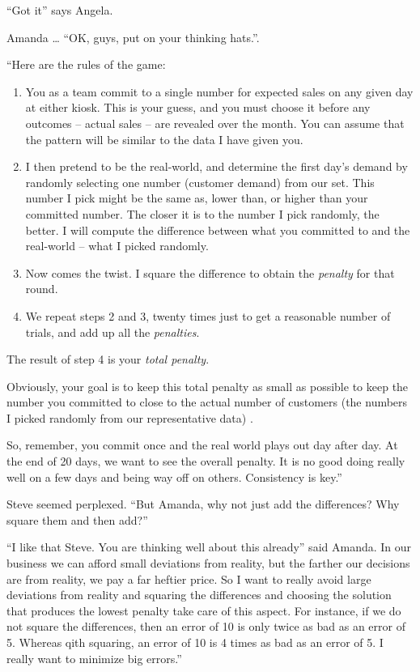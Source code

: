 \documentclass[
  12pt,
  letterpaper,
  DIV=11,
  numbers=noendperiod]{scrreprt}
\begin{document}
``Got it'' says Angela.

Amanda \ldots{} ``OK, guys, put on your thinking hats.''.

``Here are the rules of the game:

\begin{enumerate}
\def\labelenumi{\arabic{enumi}.}
\item
  You as a team commit to a single number for expected sales on any
  given day at either kiosk. This is your guess, and you must choose it
  before any outcomes -- actual sales -- are revealed over the month.
  You can assume that the pattern will be similar to the data I have
  given you.
\item
  I then pretend to be the real-world, and determine the first day's
  demand by randomly selecting one number (customer demand) from our
  set. This number I pick might be the same as, lower than, or higher
  than your committed number. The closer it is to the number I pick
  randomly, the better. I will compute the difference between what you
  committed to and the real-world -- what I picked randomly.
\item
  Now comes the twist. I square the difference to obtain the
  \emph{penalty} for that round.
\item
  We repeat steps 2 and 3, twenty times just to get a reasonable number
  of trials, and add up all the \emph{penalties}.
\end{enumerate}

The result of step 4 is your \emph{total penalty}.

Obviously, your goal is to keep this total penalty as small as possible
to keep the number you committed to close to the actual number of
customers (the numbers I picked randomly from our representative data) .

So, remember, you commit once and the real world plays out day after
day. At the end of 20 days, we want to see the overall penalty. It is no
good doing really well on a few days and being way off on others.
Consistency is key.''

Steve seemed perplexed. ``But Amanda, why not just add the differences?
Why square them and then add?''

``I like that Steve. You are thinking well about this already'' said
Amanda. In our business we can afford small deviations from reality, but
the farther our decisions are from reality, we pay a far heftier price.
So I want to really avoid large deviations from reality and squaring the
differences and choosing the solution that produces the lowest penalty
take care of this aspect. For instance, if we do not square the
differences, then an error of 10 is only twice as bad as an error of 5.
Whereas qith squaring, an error of 10 is 4 times as bad as an error of
5. I really want to minimize big errors.''
\end{document}
